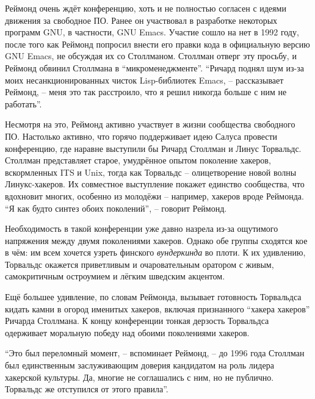 Реймонд очень ждёт конференцию, хоть и не полностью согласен с идеями движения за свободное ПО. Ранее он участвовал в разработке некоторых программ GNU, в частности, GNU Emacs. Участие сошло на нет в 1992 году, после того как Реймонд попросил внести его правки кода в официальную версию GNU Emacs, не обсуждая их со Столлманом. Столлман отверг эту просьбу, и Реймонд обвинил Столлмана в ``микроменеджменте''. ``Ричард поднял шум из-за моих несанкционированных чисток Lisp-библиотек Emacs, -- рассказывает Реймонд, -- меня это так расстроило, что я решил никогда больше с ним не работать''.

Несмотря на это, Реймонд активно участвует в жизни сообщества свободного ПО. Настолько активно, что горячо поддерживает идею Салуса провести конференцию, где наравне выступили бы Ричард Столлман и Линус Торвальдс. Столлман представляет старое, умудрённое опытом поколение хакеров, вскормленных ITS и Unix, тогда как Торвальдс -- олицетворение новой волны Линукс-хакеров. Их совместное выступление покажет единство сообщества, что вдохновит многих, особенно из молодёжи -- например, хакеров вроде Реймонда. ``Я как будто синтез обоих поколений'', -- говорит Реймонд.

Необходимость в такой конференции уже давно назрела из-за ощутимого напряжения между двумя поколениями хакеров. Однако обе группы сходятся кое в чём: им всем хочется узреть финского \textit{вундеркинда} во плоти. К их удивлению, Торвальдс окажется приветливым и очаровательным оратором с живым, самокритичным остроумием и лёгким шведским акцентом. 

Ещё большее удивление, по словам Реймонда, вызывает готовность Торвальдса кидать камни в огород именитых хакеров, включая признанного ``хакера хакеров'' Ричарда Столлмана. К концу конференции тонкая дерзость Торвальдса одерживает моральную победу над обоими поколениями хакеров.

``Это был переломный момент, -- вспоминает Реймонд, -- до 1996 года Столлман был единственным заслуживающим доверия кандидатом на роль лидера хакерской культуры. Да, многие не соглашались с ним, но не публично. Торвальдс же отступился от этого правила''.

